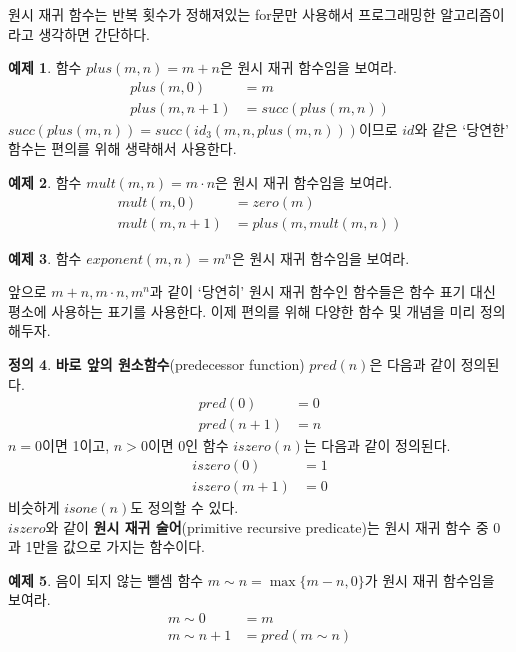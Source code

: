 \documentclass[b5paper, 11pt]{book}
\theoremstyle{definition}
\newtheorem{defn}{정의}[chapter]
\newtheorem{ex}[defn]{예제}
\begin{document}
원시 재귀 함수는 반복 횟수가 정해져있는 for문만 사용해서 프로그래밍한 
알고리즘이라고 생각하면 간단하다.
\begin{ex}
    함수 $plus(m, n) = m+n$은 원시 재귀 함수임을 보여라. 
    \begin{align*}
        plus(m, 0) &= m \\
        plus(m, n+1) &= succ(plus(m, n)) 
    \end{align*}
    $succ(plus(m,n)) = succ(id_3(m, n, plus(m, n)))$이므로 $id$와 같은 `당연한' 함수는 
    편의를 위해 생략해서 사용한다.
\end{ex}
\begin{ex}
    함수 $mult(m,n) = m\cdot n$은 원시 재귀 함수임을 보여라.
    \begin{align*}
        mult(m,0) &= zero(m) \\ 
        mult(m,n+1) &= plus(m,mult(m,n))
    \end{align*}
\end{ex}
\begin{ex}
    함수 $exponent(m,n) = m^n$은 원시 재귀 함수임을 보여라.
\end{ex}
앞으로 $m+n, m\cdot n, m^n$과 같이 `당연히' 원시 재귀 함수인 함수들은 함수 
표기 대신 평소에 사용하는 표기를 사용한다. 이제 편의를 위해 다양한 함수 및 개념을 미리 정의해두자. 
\begin{defn}
    \textbf{바로 앞의 원소함수}(predecessor function) $pred(n)$은 다음과 같이 정의된다.
    \begin{align*}
        pred(0) &= 0 \\ 
        pred(n+1) &= n
    \end{align*}
    $n = 0$이면 1이고, $n>0$이면 0인 함수 $iszero(n)$는 다음과 같이 정의된다.
    \begin{align*}
        iszero(0) &= 1 \\ 
        iszero(m+1) &= 0 
    \end{align*}
    비슷하게 $isone(n)$도 정의할 수 있다. \\ 
    $iszero$와 같이 \textbf{원시 재귀 술어}(primitive recursive predicate)는 원시 재귀 함수 중 0과 1만을 값으로 가지는 함수이다.
\end{defn}
\begin{ex}
    음이 되지 않는 뺄셈 함수 $m \sim n = \max \{ m - n , 0\}$가 원시 재귀 함수임을 보여라.
    \begin{align*}
        m \sim 0 &= m \\ 
        m \sim n+1 &= pred(m \sim n) 
    \end{align*}
\end{ex}
\end{document}
